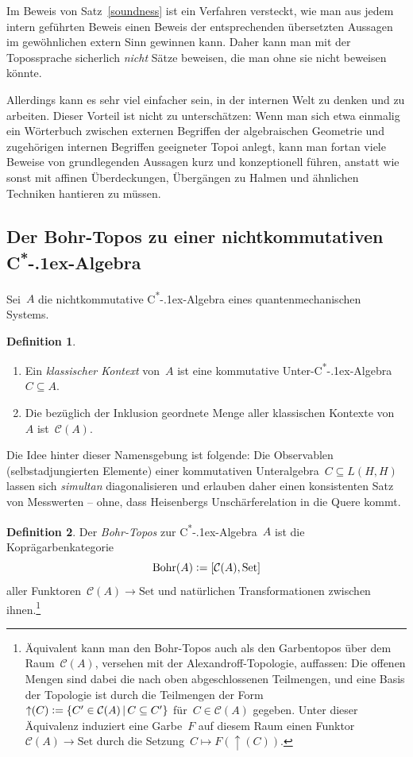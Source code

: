 \documentclass[a4paper,ngerman,12pt]{scrartcl}
\theoremstyle{definition}
\newtheorem{defn}{Definition}[section]
\theoremstyle{plain}
\theoremstyle{remark}
\newcommand{\C}{\mathcal{C}}
\newcommand{\Bohr}{\mathrm{Bohr}}
\newcommand{\csalgebra}{C\textsuperscript{*}\kern-.1ex-Algebra}
\newcommand{\Set}{\mathrm{Set}}
\renewcommand{\_}{\mathpunct{.}\,}
\newcommand{\?}{\,{:}\,}
\newcommand{\defeq}{\vcentcolon=}
\begin{document}
Im Beweis von Satz~\ref{soundness} ist ein Verfahren versteckt, wie man aus
jedem intern geführten Beweis einen Beweis der entsprechenden übersetzten
Aussagen im gewöhnlichen extern Sinn gewinnen kann. Daher kann man mit der
Topossprache sicherlich \emph{nicht} Sätze beweisen, die man ohne sie nicht
beweisen könnte.

Allerdings kann es sehr viel einfacher sein, in der internen Welt zu denken und
zu arbeiten. Dieser Vorteil ist nicht zu unterschätzen: Wenn man sich etwa
einmalig ein Wörterbuch zwischen externen Begriffen der algebraischen Geometrie
und zugehörigen internen Begriffen geeigneter Topoi anlegt, kann man fortan
viele Beweise von grundlegenden Aussagen kurz und konzeptionell
führen, anstatt wie sonst mit affinen Überdeckungen, Übergängen zu Halmen
und ähnlichen Techniken hantieren zu müssen.


\subsection{\texorpdfstring{Der Bohr-Topos zu einer nichtkommutativen
\csalgebra}{Der Bohr-Topos zu einer nichtkommutativen C*-Algebra}}

Sei~$A$ die nichtkommutative \csalgebra{} eines quantenmechanischen Systems.

\begin{defn}\begin{enumerate}
\item
Ein \emph{klassischer Kontext} von~$A$ ist eine kommutative Unter-\csalgebra~$C
\subseteq A$.
\item Die bezüglich der Inklusion geordnete Menge aller klassischen Kontexte
von~$A$ ist~$\C(A)$.
\end{enumerate}
\end{defn}

Die Idee hinter dieser Namensgebung ist folgende: Die Observablen
(selbstadjungierten Elemente) einer kommutativen Unteralgebra~$C \subseteq
L(H,H)$ lassen sich \emph{simultan} diagonalisieren und erlauben daher einen
konsistenten Satz von Messwerten -- ohne, dass Heisenbergs Unschärferelation in
die Quere kommt.

\begin{defn}Der \emph{Bohr-Topos} zur \csalgebra~$A$ ist die Koprägarbenkategorie
\[ \Bohr(A) \defeq [\C(A), \Set] \]
aller Funktoren~$\C(A) \to \Set$ und natürlichen Transformationen zwischen
ihnen.\footnote{Äquivalent kann man den Bohr-Topos auch als den Garbentopos
über dem Raum~$\C(A)$, versehen mit der Alexandroff-Topologie, auffassen: Die offenen Mengen
sind dabei die nach oben abgeschlossenen Teilmengen, und eine Basis der
Topologie ist durch die Teilmengen der Form~${\uparrow}(C) \defeq \{ C' \in \C(A)
\,|\, C \subseteq C' \}$ für~$C \in \C(A)$ gegeben. Unter dieser Äquivalenz
induziert eine Garbe~$F$ auf diesem
Raum einen Funktor~$\C(A) \to \Set$ durch die Setzung~$C \mapsto
F({\uparrow}(C))$.}
\end{defn}
\end{document}
